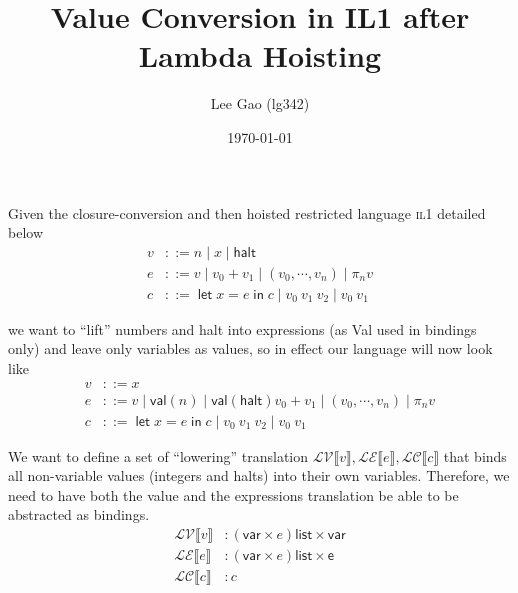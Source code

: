 \documentclass[11pt,a4paper]{article}
\author{Lee Gao (lg342)}
\title{Value Conversion in IL1 after Lambda Hoisting}
\date{\today}
\newcommand {\coo} [1] {\ensuremath{\operatorname{\mathsf{#1}}}}
\newcommand{\Let}[1]{\coo{let} #1 \coo{in} }
\newcommand{\f}[1]{\textsc{#1}}
\newcommand{\g}[1]{\textsf{#1}}
\newcommand{\trans}[2]{\ensuremath{\mathcal{#1}\llbracket #2\rrbracket}}
\begin{document}
\maketitle
\setlength{\parindent}{0pt}

Given the closure-conversion and then hoisted restricted language \f{il1} detailed below
\begin{align*}
v &::= n \mid x \mid \g{halt} \\
e &::= v \mid v_0 + v_1 \mid (v_0,\cdots, v_n) \mid \pi_n v \\
c &::= \Let{x = e}{c} \mid v_0~v_1~v_2 \mid v_0 ~ v_1
\end{align*}

we want to ``lift'' numbers and halt into expressions (as Val used in bindings only) and leave only variables as values, so in effect our language will now look like
\begin{align*}
v &::= x \\
e &::= v \mid \g{val}(n) \mid \g{val}(\g{halt}) v_0 + v_1 \mid (v_0,\cdots, v_n) \mid \pi_n v \\
c &::= \Let{x = e}{c} \mid v_0~v_1~v_2 \mid v_0 ~ v_1
\end{align*}

We want to define a set of ``lowering'' translation $\trans{LV}{v}, \trans{LE}{e}, \trans{LC}{c}$ that binds all non-variable values (integers and halts) into their own variables. Therefore, we need to have both the value and the expressions translation be able to be abstracted as bindings.
\begin{align*}
\trans{LV}{v} &: (\g{var} \times e) \g{list} \times \g{var} \\
\trans{LE}{e} &: (\g{var} \times e) \g{list} \times \g{e} \\
\trans{LC}{c} &: c
\end{align*}
\end{document}
